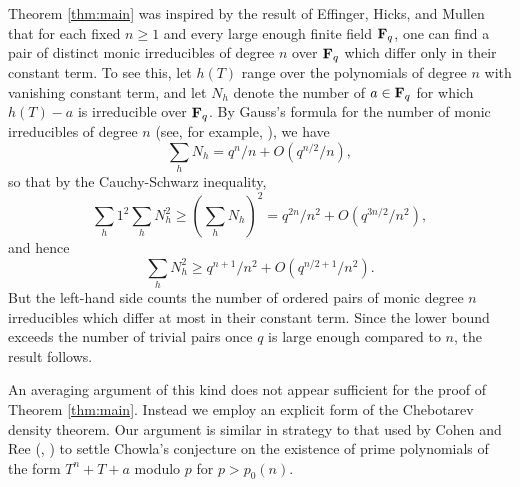 \documentclass[a4paper]{compositio}
\begin{document}
Theorem \ref{thm:main} was inspired by the result of Effinger,
Hicks, and Mullen \cite{ehm02} that for each fixed $n \geq 1$ and
every large enough finite field $\mathbf{F}_q$, one can find a pair of
distinct monic irreducibles of degree $n$ over $\mathbf{F}_q$ which differ
only in their constant term. To see this, let $h(T)$ range over the
polynomials of degree $n$ with vanishing constant term, and let
$N_h$ denote the number of $a \in \mathbf{F}_q$ for which $h(T)-a$ is
irreducible over $\mathbf{F}_q$. By Gauss's formula for the number of monic
irreducibles of degree $n$ (see, for example, \cite[Theorem
3.25]{ln97}), we have
\[ \sum_{h} N_{h} = q^n/n + O(q^{n/2}/n), \]
so that by the Cauchy-Schwarz inequality,
\[ \sum_{h}{1^2} \sum_{h} N_{h}^2 \geq \left(\sum_{h} N_{h}\right)^2=
q^{2n}/n^2 + O(q^{3n/2}/n^2), \] and hence
\[ \sum_{h} N_{h}^2 \geq q^{n+1}/n^2 + O(q^{n/2+1}/n^2). \]
But the left-hand side counts the number of ordered pairs of monic
degree $n$ irreducibles which differ at most in their constant term.
Since the lower bound exceeds the number of trivial pairs once $q$
is large enough compared to $n$, the result follows.

An averaging argument of this kind does not appear sufficient for
the proof of Theorem \ref{thm:main}. Instead we employ an explicit
form of the Chebotarev density theorem. Our argument is similar in
strategy to that used by Cohen \cite{cohen70} and Ree (\cite{ree71},
\cite{ree72}) to settle Chowla's conjecture \cite{chowla66} on the
existence of prime polynomials of the form $T^n + T + a$ modulo $p$
for $p > p_0(n)$.
\end{document}
